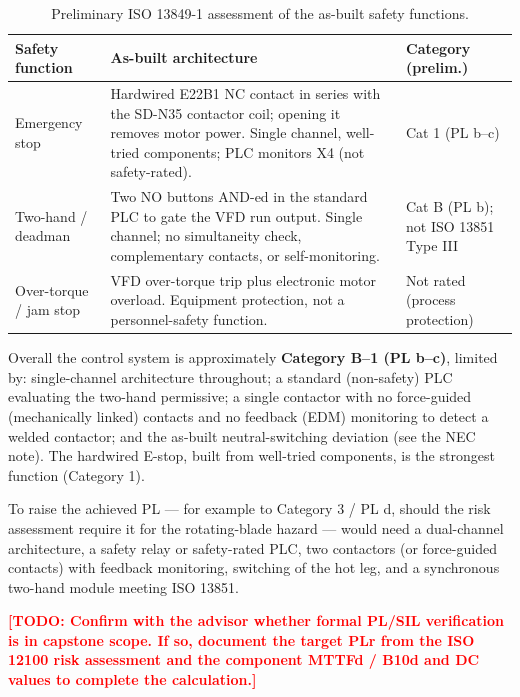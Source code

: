 \documentclass[hidelinks,12pt]{article}
\newcommand{\todo}[1]{\textcolor{red}{\textbf{[TODO: #1]}}}
\begin{document}
\begin{table}[H]
\centering
\renewcommand{\arraystretch}{1.3}
\caption{Preliminary ISO 13849-1 assessment of the as-built safety functions.}
\label{tab:pl}
\begin{tabularx}{\textwidth}{|p{2.5cm}|X|p{2.3cm}|}
\hline
\rowcolor{PSUgreen!12}\textbf{Safety function} & \textbf{As-built architecture} & \textbf{Category (prelim.)} \\
\hline
Emergency stop & Hardwired E22B1 NC contact in series with the SD-N35 contactor coil; opening it removes motor power. Single channel, well-tried components; PLC monitors X4 (not safety-rated). & Cat 1 (PL b--c) \\ \hline
Two-hand / deadman & Two NO buttons AND-ed in the standard PLC to gate the VFD run output. Single channel; no simultaneity check, complementary contacts, or self-monitoring. & Cat B (PL b); not ISO 13851 Type III \\ \hline
Over-torque / jam stop & VFD over-torque trip plus electronic motor overload. Equipment protection, not a personnel-safety function. & Not rated (process protection) \\
\hline
\end{tabularx}
\end{table}

Overall the control system is approximately \textbf{Category B--1 (PL b--c)}, limited by: single-channel architecture throughout; a standard (non-safety) PLC evaluating the two-hand permissive; a single contactor with no force-guided (mechanically linked) contacts and no feedback (EDM) monitoring to detect a welded contactor; and the as-built neutral-switching deviation (see the NEC note). The hardwired E-stop, built from well-tried components, is the strongest function (Category 1).

To raise the achieved PL --- for example to Category 3 / PL d, should the risk assessment require it for the rotating-blade hazard --- would need a dual-channel architecture, a safety relay or safety-rated PLC, two contactors (or force-guided contacts) with feedback monitoring, switching of the hot leg, and a synchronous two-hand module meeting ISO 13851.

\todo{Confirm with the advisor whether formal PL/SIL verification is in capstone scope. If so, document the target PLr from the ISO 12100 risk assessment and the component MTTFd / B10d and DC values to complete the calculation.}
\end{document}
